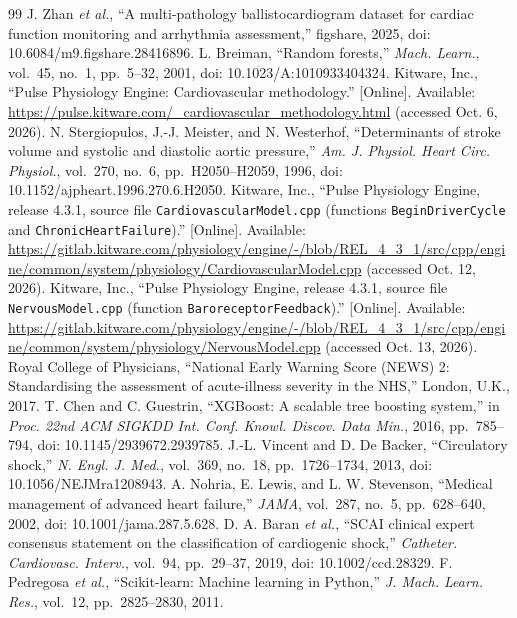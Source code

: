 \documentclass[conference]{IEEEtran}
\begin{document}
\begin{thebibliography}{99}
 J. Zhan \textit{et al.}, ``A multi-pathology ballistocardiogram dataset for cardiac function monitoring and arrhythmia assessment,'' figshare, 2025, doi: 10.6084/m9.figshare.28416896.
 L. Breiman, ``Random forests,'' \textit{Mach. Learn.}, vol.~45, no.~1, pp.~5--32, 2001, doi: 10.1023/A:1010933404324.
 Kitware, Inc., ``Pulse Physiology Engine: Cardiovascular methodology.'' [Online]. Available: \url{https://pulse.kitware.com/_cardiovascular_methodology.html} (accessed Oct. 6, 2026).
 N. Stergiopulos, J.-J. Meister, and N. Westerhof, ``Determinants of stroke volume and systolic and diastolic aortic pressure,'' \textit{Am. J. Physiol. Heart Circ. Physiol.}, vol.~270, no.~6, pp.~H2050--H2059, 1996, doi: 10.1152/ajpheart.1996.270.6.H2050.
 Kitware, Inc., ``Pulse Physiology Engine, release 4.3.1, source file \texttt{CardiovascularModel.cpp} (functions \texttt{BeginDriverCycle} and \texttt{ChronicHeartFailure}).'' [Online]. Available: \url{https://gitlab.kitware.com/physiology/engine/-/blob/REL_4_3_1/src/cpp/engine/common/system/physiology/CardiovascularModel.cpp} (accessed Oct. 12, 2026).
 Kitware, Inc., ``Pulse Physiology Engine, release 4.3.1, source file \texttt{NervousModel.cpp} (function \texttt{BaroreceptorFeedback}).'' [Online]. Available: \url{https://gitlab.kitware.com/physiology/engine/-/blob/REL_4_3_1/src/cpp/engine/common/system/physiology/NervousModel.cpp} (accessed Oct. 13, 2026).
 Royal College of Physicians, ``National Early Warning Score (NEWS) 2: Standardising the assessment of acute-illness severity in the NHS,'' London, U.K., 2017.
 T. Chen and C. Guestrin, ``XGBoost: A scalable tree boosting system,'' in \textit{Proc. 22nd ACM SIGKDD Int. Conf. Knowl. Discov. Data Min.}, 2016, pp.~785--794, doi: 10.1145/2939672.2939785.
 J.-L. Vincent and D. De Backer, ``Circulatory shock,'' \textit{N. Engl. J. Med.}, vol.~369, no.~18, pp.~1726--1734, 2013, doi: 10.1056/NEJMra1208943.
 A. Nohria, E. Lewis, and L. W. Stevenson, ``Medical management of advanced heart failure,'' \textit{JAMA}, vol.~287, no.~5, pp.~628--640, 2002, doi: 10.1001/jama.287.5.628.
 D. A. Baran \textit{et al.}, ``SCAI clinical expert consensus statement on the classification of cardiogenic shock,'' \textit{Catheter. Cardiovasc. Interv.}, vol.~94, pp.~29--37, 2019, doi: 10.1002/ccd.28329.
 F. Pedregosa \textit{et al.}, ``Scikit-learn: Machine learning in Python,'' \textit{J. Mach. Learn. Res.}, vol.~12, pp.~2825--2830, 2011.
\end{thebibliography}
\end{document}
